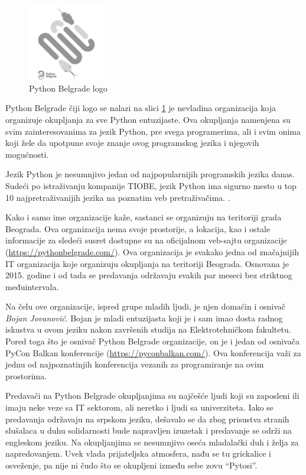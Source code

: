 \documentclass[a4paper]{article}
\begin{document}
{\begin{figure}[h!]
  \centering
  \includegraphics[width=0.3\textwidth]{pybgd.png}
  \caption{Python Belgrade logo}
  \label{fig:Pythonlogo}
\end{figure}

Python Belgrade čiji logo se nalazi na slici \ref{fig:Pythonlogo} je nevladina organizacija koja organizuje okupljanja za sve Python entuzijaste. Ova okupljanja namenjena su svim
zainteresovanima za jezik Python, pre svega programerima, ali i svim onima koji žele da upotpune svoje znanje ovog programskog jezika i njegovih mogućnosti.

Jezik Python je nesumnjivo jedan od najpopularnijih programskih jezika danas. Sudeći po istraživanju kompanije TIOBE, jezik Python ima sigurno mesto u top 10 najpretraživanijih jezika na poznatim veb pretraživačima. \cite{pythonPopular}.

Kako i samo ime organizacije kaže, sastanci se organizuju na teritoriji grada Beograda. Ova organizacija nema svoje prostorije, a lokacija, kao i ostale informacije
za sledeći susret dostupne su na oficijalnom veb-sajtu organizacije (\url{https://pythonbelgrade.com/}). Ova organizacija je svakako jedna od značajnijih IT organizacija koje organizuju okupljanja na teritoriji Beograda. Osnovana je 2015. godine i od tada se predavanja održavaju svakih par meseci bez striktnog međuintervala. 

Na čelu ove organizacije, ispred grupe mladih ljudi, je njen domaćin i osnivač \textit{Bojan Jovanović}. Bojan je mladi entuzijasta koji je i sam imao dosta radnog iskustva u ovom jeziku nakon završenih studija na
Elektrotehničkom fakultetu. Pored toga što je osnivač Python Belgrade organizacije, on je i jedan od osnivača PyCon Balkan konferencije (\url{https://pyconbalkan.com/}). Ova konferencija važi za jednu od najpoznatinjih konferencija vezanih za programiranje na ovim prostorima.

Predavači na Python Belgrade okupljanjima su najčešće ljudi koji su zaposleni ili imaju neke veze sa IT sektorom, ali neretko i ljudi sa univerziteta. \cite{pybgdSpeakers} Iako se predavanja održavaju na srpskom jeziku, dešavalo se da zbog prisustva stranih slušalaca u duhu solidarnosti bude napravljen izuzetak i predavanje se održi na engleskom jeziku. Na okupljanjima se nesumnjivo oseća mladalački duh i želja za napredovanjem. Uvek vlada prijateljska atmosfera, nađu se tu grickalice i osveženje, pa nije ni čudo što se okupljeni između sebe zovu ``Pytosi''.

}
\end{document}
